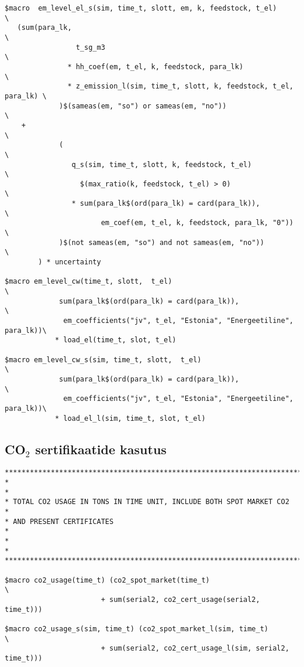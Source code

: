 \begin{verbatim}
$macro  em_level_el_s(sim, time_t, slott, em, k, feedstock, t_el)              \
   (sum(para_lk,                                                               \
                 t_sg_m3                                                       \
               * hh_coef(em, t_el, k, feedstock, para_lk)                      \
               * z_emission_l(sim, time_t, slott, k, feedstock, t_el, para_lk) \
             )$(sameas(em, "so") or sameas(em, "no"))                          \
    +                                                                          \
             (                                                                 \
                q_s(sim, time_t, slott, k, feedstock, t_el)                    \
                  $(max_ratio(k, feedstock, t_el) > 0)                         \
                * sum(para_lk$(ord(para_lk) = card(para_lk)),                  \
                       em_coef(em, t_el, k, feedstock, para_lk, "0"))          \
             )$(not sameas(em, "so") and not sameas(em, "no"))                 \
        ) * uncertainty

$macro em_level_cw(time_t, slott,  t_el)                                       \
             sum(para_lk$(ord(para_lk) = card(para_lk)),                       \
              em_coefficients("jv", t_el, "Estonia", "Energeetiline", para_lk))\
            * load_el(time_t, slot, t_el)

$macro em_level_cw_s(sim, time_t, slott,  t_el)                                \
             sum(para_lk$(ord(para_lk) = card(para_lk)),                       \
              em_coefficients("jv", t_el, "Estonia", "Energeetiline", para_lk))\
            * load_el_l(sim, time_t, slot, t_el)
\end{verbatim}

\subsection{CO$_2$ sertifikaatide kasutus}
\begin{verbatim}
********************************************************************************
*                                                                              *
* TOTAL CO2 USAGE IN TONS IN TIME UNIT, INCLUDE BOTH SPOT MARKET CO2           *
* AND PRESENT CERTIFICATES                                                     *
*                                                                              *
********************************************************************************

$macro co2_usage(time_t) (co2_spot_market(time_t)                              \
                       + sum(serial2, co2_cert_usage(serial2, time_t)))

$macro co2_usage_s(sim, time_t) (co2_spot_market_l(sim, time_t)                \
                       + sum(serial2, co2_cert_usage_l(sim, serial2, time_t)))
\end{verbatim}

